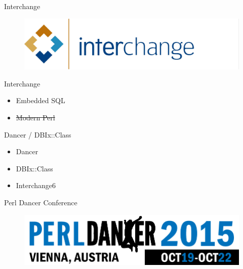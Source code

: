 \begin{frame}{Interchange}
\begin{figure}[!ht]
\centering
\includegraphics[width=1\linewidth]{img/interchange.jpg}
\end{figure}
\end{frame}

\begin{frame}{Interchange}
\begin{itemize}
\item Embedded SQL
\item \sout{Modern Perl}
\end{itemize}
\end{frame}

\begin{frame}{Dancer / DBIx::Class}
\begin{itemize}
\item Dancer
\item DBIx::Class
\item Interchange6
\end{itemize}
\end{frame}


\begin{frame}{Perl Dancer Conference}
\begin{figure}[!ht]
\centering
\includegraphics[width=1\linewidth]{img/perl-dancer-homepage-logo.png}
\end{figure}
\end{frame}


